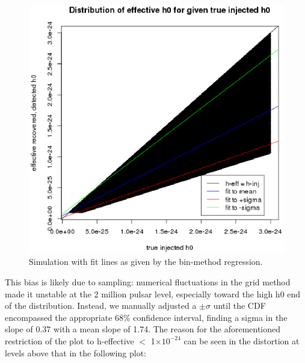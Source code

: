 \begin{figure}
\begin{center}
\includegraphics[width=0.3\paperwidth,height=0.2\paperheight]{PlotHEffVsH0TrueWithLines.eps}
\caption{Simulation with fit lines as given by the bin-method regression.
}
\end{center}
\end{figure}


This bias is likely due to sampling: numerical fluctuations in the grid method made it unstable at the 2 million pulsar level, especially toward the high h0 end of the distribution. Instead, we manually adjusted a $\pm \sigma$ until the CDF encompassed the appropriate 68\% confidence interval, finding a sigma in the slope of 0.37 with a mean slope of 1.74. The reason for the aforementioned restriction of the plot to h-effective $<$ 1$\times 10^{-24}$ can be seen in the distortion at levels above that in the following plot:

